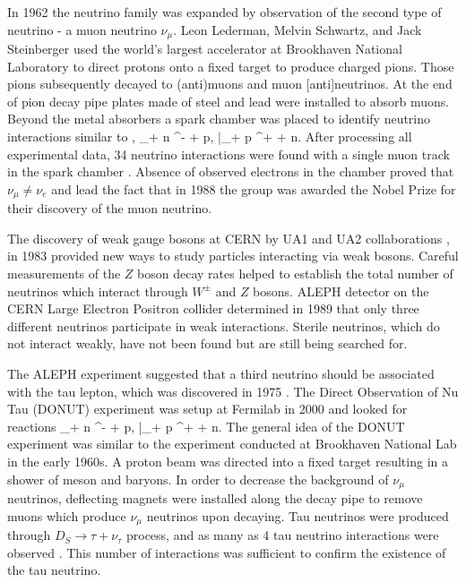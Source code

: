 In 1962 the neutrino family was expanded by observation of the second type of neutrino - 
a muon neutrino $\nu_\mu$.  Leon Lederman, Melvin Schwartz, and Jack Steinberger used 
the world's largest accelerator at Brookhaven National Laboratory to direct protons onto 
a fixed target to produce charged pions. Those pions subsequently decayed to 
(anti)muons and muon [anti]neutrinos. At the end of pion decay pipe plates made of steel 
and lead were installed to absorb muons. Beyond the metal absorbers a spark chamber was 
placed to identify neutrino interactions similar to ,
\be
\nu_\mu + n \rightarrow \mu^- + p,\qquad
\bar{\nu}_\mu + p \rightarrow \mu^+ + n.
\ee
After processing all experimental data, 34 neutrino interactions were found with 
a single muon track in the spark chamber \cite{danby}. Absence of observed electrons in 
the chamber proved that $\nu_\mu \ne \nu_e$ and lead the fact that in 1988 the group was awarded 
the Nobel Prize for their discovery of the muon neutrino.

The discovery of weak gauge bosons at CERN by UA1 and UA2 collaborations \cite{arnison}, 
\cite{arnison2} in 1983 provided new ways to study particles interacting via weak bosons. 
Careful measurements of the $Z$ boson decay rates helped to establish the total number 
of neutrinos which interact through $W^\pm$ and $Z$ bosons. ALEPH detector on the 
CERN Large Electron Positron collider determined \cite{decamp} in 1989 that only 
three different neutrinos participate in weak interactions. Sterile neutrinos, which 
do not interact weakly, have not been found but are still being searched for.

The ALEPH experiment suggested that a third neutrino should be associated with the tau 
lepton, which was discovered in 1975 \cite{perl}. The Direct Observation of Nu Tau (DONUT) 
experiment was setup at Fermilab in 2000 and looked for reactions
\be
\nu_\tau + n \rightarrow \tau^- + p,\qquad
\bar{\nu}_\tau + p \rightarrow \tau^+ + n.
\ee
The general idea of the DONUT experiment was similar to the experiment conducted at 
Brookhaven National Lab in the early 1960s. A proton beam was directed into a fixed 
target resulting in a shower of meson and baryons. In order to decrease the background 
of $\nu_\mu$ neutrinos, deflecting magnets were installed along the decay pipe to remove 
muons which produce $\nu_\mu$ neutrinos upon decaying. Tau neutrinos were produced through 
$D_S \rightarrow \tau + \nu_\tau$ process, and as many as 4 tau neutrino interactions 
were observed \cite{kodama}. This number of interactions was sufficient to confirm 
the existence of the tau neutrino.

